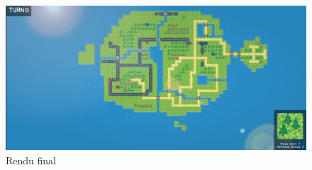 \begin{figure}[h]
    \centering
    \includegraphics[scale =0.45]{images/rendufinal.png}
    \caption{Rendu final}
    \label{fig:Advance Wars}
\end{figure}


\newline

